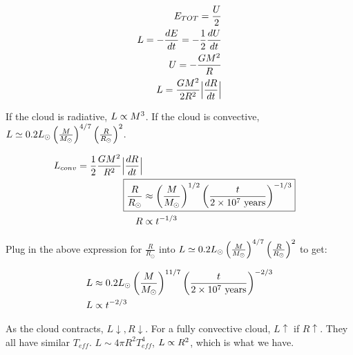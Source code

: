 \begin{align}
E_{TOT} = \frac{U}{2}\\
L = -\frac{dE}{dt} = -\frac{1}{2} \frac{dU}{dt}\\
U = -\frac{GM^2}{R}\\
L = \frac{GM^2}{2R^2} \Bigl\lvert \frac{dR}{dt} \Bigl\lvert
\end{align}

If the cloud is radiative, $L \propto M^3$. If the cloud is convective, $L \simeq 0.2 L_\odot \left( \frac{M}{M_\odot}\right)^{4/7} \left( \frac{R}{R_\odot}\right)^2$. 

\begin{align}
L_{conv} = \frac{1}{2}\frac{GM^2}{R^2} \Bigl\lvert \frac{dR}{dt} \Bigl\lvert\\
\Aboxed{\frac{R}{R_\odot} &\approx \lp \frac{M}{M_\odot}\rp^{1/2} \lp \frac{t}{2 \times 10^7 \text{ years}} \rp^{-1/3}}\\
R &\pt t^{-1/3}
\end{align}

Plug in the above expression for $\frac{R}{R_\odot}$ into $L \simeq 0.2 L_\odot \left( \frac{M}{M_\odot}\right)^{4/7} \left( \frac{R}{R_\odot}\right)^2$ to get:

\begin{align}
L&\approx 0.2 L_\odot \left( \frac{M}{M_\odot}\right)^{11/7} \left( \frac{t}{2 \times 10^7 \text{ years}}\right)^{-2/3}\\
L &\propto t^{-2/3}
\end{align}

As the cloud contracts, $L \downarrow, R \downarrow$. For a fully convective cloud, $L \uparrow$ if $R \uparrow$. They all have similar $T_{eff}$. $L \sim 4 \pi R^2 T_{eff}^4$, $L \propto R^2$, which is what we have.
